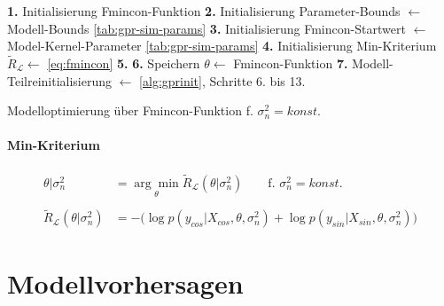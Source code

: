 \begin{algorithm}[htp]
	\SetAlgoLined
	\textbf{1.} Initialisierung Fmincon-Funktion\;
	\textbf{2.} Initialisierung Parameter-Bounds $\leftarrow$ Modell-Bounds \autoref{tab:gpr-sim-params}\;
	\textbf{3.} Initialisierung Fmincon-Startwert $\leftarrow$ Model-Kernel-Parameter \autoref{tab:gpr-sim-params}\;
	\textbf{4.} Initialisierung Min-Kriterium $\tilde{R}_{\mathcal{L}} \leftarrow$ \autoref{eq:fmincon}\;
	\textbf{5.} 
	\textbf{6.} Speichern $\theta \leftarrow$ Fmincon-Funktion\;
	\textbf{7.} Modell-Teilreinitialisierung $\leftarrow$ \autoref{alg:gprinit}, Schritte 6. bis 13.\;
	\caption{Modelloptimierung über Fmincon-Funktion f. $\sigma_n^2 = konst.$}
	\label{alg:fminconopt}
\end{algorithm}


\paragraph*{Min-Kriterium}


\begin{align}\label{eq:fmincon}
\theta|\sigma_n^2 &= \underset{\theta}{\arg\min} \tilde{R}_{\mathcal{L}}(\theta|\sigma_n^2) \qquad \text{f. } \sigma_n^2 = konst. \nonumber \\
\\
\tilde{R}_{\mathcal{L}}(\theta|\sigma_n^2) &= -\big( \log p(y_{cos}|X_{cos}, \theta, \sigma_n^2) + \log p(y_{sin}|X_{sin}, \theta, \sigma_n^2) \big) \nonumber
\end{align}


\clearpage


\section{Modellvorhersagen}


